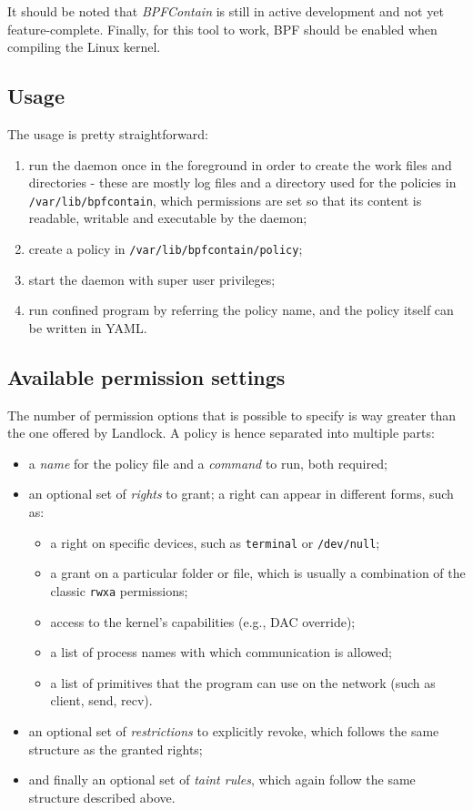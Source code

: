 It should be noted that \textit{BPFContain} is still in active development and not yet feature-complete.
Finally, for this tool to work, BPF should be enabled when compiling the Linux kernel.

\subsection{Usage}

The usage is pretty straightforward:
\begin{enumerate}
  \item run the daemon once in the foreground in order to create the work files and directories -
        these are mostly log files and a directory used for the policies in \texttt{/var/lib/bpfcontain},
        which permissions are set so that its content is readable, writable and executable by the daemon;
  \item create a policy in \texttt{/var/lib/bpfcontain/policy};
  \item start the daemon with super user privileges;
  \item run confined program by referring the policy name, and the policy itself can be written in YAML.
\end{enumerate}

\subsection{Available permission settings}

The number of permission options that is possible to specify is way greater than the one offered by Landlock.
A policy is hence separated into multiple parts:
\begin{itemize}
  \item a \textit{name} for the policy file and a \textit{command} to run, both required;
  \item an optional set of \textit{rights} to grant; a right can appear in different forms, such as:
        \begin{itemize}
          \item a right on specific devices, such as \texttt{terminal} or \texttt{/dev/null};
          \item a grant on a particular folder or file, which is usually a combination of the classic \texttt{rwxa} permissions;
          \item access to the kernel's capabilities (e.g., DAC override);
          \item a list of process names with which communication is allowed;
          \item a list of primitives that the program can use on the network (such as client, send, recv).
        \end{itemize}
  \item an optional set of \textit{restrictions} to explicitly revoke, which follows the same structure as the
        granted rights;
  \item and finally an optional set of \textit{taint rules}, which again follow the same structure described above.
\end{itemize}

